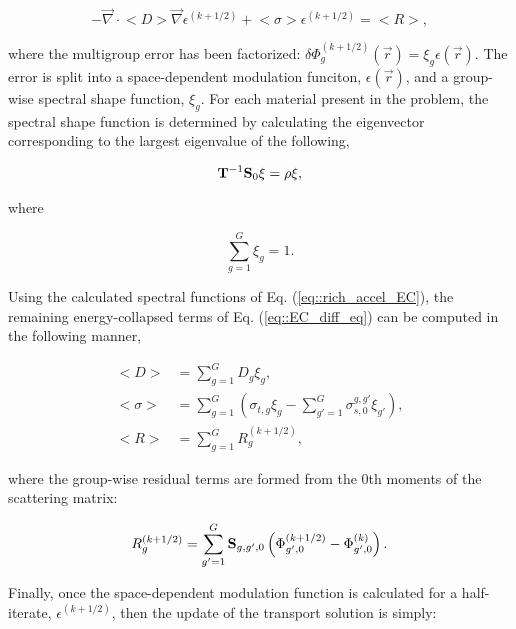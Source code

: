 \documentclass[11pt]{article}
\begin{document}
\begin{equation}
\label{eq::EC_diff_eq}
- \vec{\nabla} \cdot \Big< D \Big> \vec{\nabla} \epsilon^{(k+1/2)} +  \Big< \sigma \Big> \epsilon^{(k+1/2)} = \Big< R \Big> ,
\end{equation}

\noindent where the multigroup error has been factorized: $\delta \Phi_g^{(k+1/2)} (\vec{r}) = \xi_g \epsilon (\vec{r})$. The error is split into a space-dependent modulation funciton, $\epsilon (\vec{r})$, and a group-wise spectral shape function, $\xi_g$. For each material present in the problem, the spectral shape function is determined by calculating the eigenvector corresponding to the largest eigenvalue of the following,

\begin{equation}
\label{eq::rich_accel_EC}
{\bf T} ^{-1} {\bf S}_0 \xi = \rho \xi ,
\end{equation}

\noindent where

\begin{equation}
\label{eq::rich_accel_EC_sum}
\sum_{g=1}^G \xi_g = 1 .
\end{equation}

\noindent Using the calculated spectral functions of Eq. (\ref{eq::rich_accel_EC}), the remaining energy-collapsed terms of Eq. (\ref{eq::EC_diff_eq}) can be computed in the following manner,

\begin{equation}
\label{eq::EC_diff_terms}
\begin{aligned}
\Big< D \Big> &= \sum_{g=1}^G D_g \xi_g ,\\
\Big< \sigma \Big> &=  \sum_{g=1}^G \left(   \sigma_{t,g} \xi_g -  \sum_{g'=1}^G \sigma_{s,0}^{g,g'} \xi_{g'} \right)  ,\\
\Big< R \Big> &= \sum_{g=1}^G R_g^{(k+1/2)},
\end{aligned} 
\end{equation}

\noindent where the group-wise residual terms are formed from the 0th moments of the scattering matrix:

\begin{equation}
\label{eq::rich_residual}
R_g^{(k+1/2)} =  \sum_{g'=1}^G {\bf S}_{g, g',0} \left(  \Phi_{g',0}^{(k+1/2)} - \Phi_{g',0}^{(k)}  \right).
\end{equation}

\noindent Finally, once the space-dependent modulation function is calculated for a half-iterate, $\epsilon^{(k+1/2)}$, then the update of the transport solution is simply:
\end{document}
